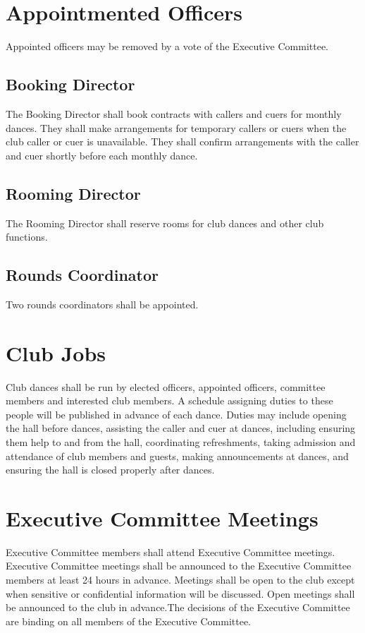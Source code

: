 \documentclass{article}
\begin{document}
\section {Appointmented Officers}
Appointed officers may be removed by a vote of the Executive Committee. 
\subsection{Booking Director}
The Booking Director shall book contracts with callers and cuers for monthly dances. They shall make arrangements for temporary callers or cuers when the club caller or cuer is unavailable. They shall confirm arrangements with the caller and cuer shortly before each monthly dance. \\
\subsection{Rooming Director} The Rooming Director shall reserve rooms for club dances and other club functions. 
\subsection{Rounds Coordinator} Two rounds coordinators shall be appointed. 
\section {Club Jobs}
Club dances shall be run by elected officers, appointed officers, committee members and interested club members.  A schedule assigning duties to these people will be published in advance of each dance. Duties may include opening the hall before dances, assisting the caller and cuer at dances, including ensuring them help to and from the hall, coordinating refreshments, taking admission and attendance of club members and guests, making announcements at dances,  and ensuring the hall is closed properly after dances. 
\section {Executive Committee Meetings}
Executive Committee members shall attend Executive Committee meetings. Executive Committee meetings shall be announced to the Executive Committee members at least 24 hours in advance. Meetings shall be open to the club except when sensitive or confidential information will be discussed. Open meetings shall be announced to the club in advance.The decisions of the Executive Committee are binding on all members of
the Executive Committee.
\end{document}
